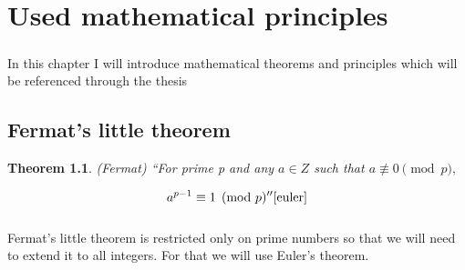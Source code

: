 \documentclass[thesis=B,english]{FITthesis}[2012/10/20]
\newtheorem{theorem}{Theorem}
\begin{document}
{\paragraph*{}{
}
\paragraph*{}{
}

\chapter{Used mathematical principles}
\paragraph*{}{
In this chapter I will introduce mathematical theorems and principles which will be referenced through the thesis
}

\section{Fermat's little theorem}
\begin{theorem}(Fermat)
{
``For prime p and any \(a \in Z\) such that \(a \not\equiv 0 \pmod p,\)}

\[a^{p-1} \equiv 1 \pmod p ''\cite{euler}\]
\end{theorem}

\paragraph*{}
{Fermat's little theorem is restricted only on prime numbers so that we will need to extend it to all integers. For that we will use Euler's theorem.}
% 

}
\end{document}

